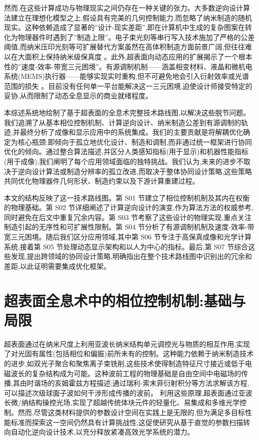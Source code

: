 \documentclass[11pt]{article}
\begin{document}
然而,在这些计算成功与物理现实之间仍存在一种关键的张力。大多数逆向设计算法建立在理想化模型之上,假设具有完美的几何控制能力,而忽略了纳米制造的随机现实。这种依赖造成了显著的''设计-现实差距'',即在计算机中生成的复杂图案在转化为物理器件时遇到了''制造上限''。电子束光刻等串行写入技术施加了严格的公差阈值,而纳米压印光刻等可扩展替代方案虽然在高体积制造方面前景广阔,但往往难以在大面积上保持纳米级保真度 \citep{doi_10_3390_encyclopedia5040197_fe6bfdc9}。此外,超表面向动态应用的扩展揭示了一个根本性的''速度-效率-带宽三元困境''。有源调制机制------涵盖相变材料、液晶和微机电系统(MEMS)执行器------能够实现实时重构,但不可避免地会引入衍射效率或光谱范围的损失 \citep{doi_10_1002_lpor_71186_5fa1be75}。目前没有任何单一平台能解决这一三元困境,迫使设计师接受特定的妥协,从而限制了动态全息显示的商业就绪程度。

本综述系统地绘制了基于超表面的全息术完整技术路线图,以解决这些脱节问题。我们追溯了从基本相位控制机制、计算逆向设计、纳米制造公差到有源调制的轨迹,并最终分析了成像和显示应用中的系统集成。我们的主要贡献是将解耦优化确定为核心瓶颈:即倾向于孤立地优化设计、制造和调制,而非通过统一框架进行协同优化的倾向。通过整合算法描述,并区分人类感知指标(用于显示)和机器性能指标(用于成像),我们阐明了每个应用领域面临的独特挑战。我们认为,未来的进步不取决于逆向设计算法或制造分辨率的孤立改进,而取决于整体协同设计策略,这些策略共同优化物理器件几何形状、制造约束以及下游计算重建过程。

本文的结构反映了这一技术路线图。第 S01 节建立了相位控制机制及其内在权衡的物理基础。第 S02 节详细阐述了计算逆向设计的演变,作为算法方法的权威参考,同时避免在后文中重复冗余内容。第 S03 节考察了这些设计的物理实现,重点关注制造引起的无序性和可扩展性限制。第 S04 节分析了有源调制机制及速度-效率-带宽三元困境。随后我们区分应用领域,其中第 S06 节专注于高保真成像和光学计算系统,接着第 S05 节处理动态显示架构和以人为中心的指标。最后,第 S07 节综合这些发现,提出跨领域的协同设计策略,明确指出在整个技术路线图中识别出的冗余和差距,以此证明需要集成优化框架。

\section{超表面全息术中的相位控制机制:基础与局限}\label{ux8d85ux8868ux9762ux5168ux606fux672fux4e2dux7684ux76f8ux4f4dux63a7ux5236ux673aux5236ux57faux7840ux4e0eux5c40ux9650}

超表面通过在纳米尺度上利用亚波长纳米结构单元调控光与物质的相互作用,实现了对光固有属性(包括相位和偏振)前所未有的控制。这种能力依赖于纳米制造技术的进步,如双光子聚合和聚焦离子束铣削,这些技术使得制造特征尺寸接近或低于电磁波长的复杂结构成为可能。这种波前工程的物理基础是自由空间中电磁场的传播,其由时谐场的亥姆霍兹方程描述;通过瑞利-索末菲衍射积分等方法求解该方程,可以描述次级球面子波如何干涉形成传播的波前。\citep{doi_10_21236_ada421453_63603a3f} \citep{doi_10_1364_ol_509688_f6e1ff85} 利用这些原理,超表面通过亚波长微/纳结构操控光场,实现了超越传统体块元件的轻量化、易集成和多维光学控制。然而,尽管这类材料提供的参数设计空间在实践上是无限的,但为满足多目标性能标准而探索这一空间仍然具有计算挑战性,这促使研究从基于直觉的参数扫描转向自动化逆向设计技术,以充分释放紧凑高效光学系统的潜力。\citep{doi_10_1021_acsphotonics_3c00572_fda8f742} \citep{doi_10_1002_advs_202504634_52bafb6c} \citep{doi_10_1038_s41377_026_02272_y_42e58df2}
\end{document}
